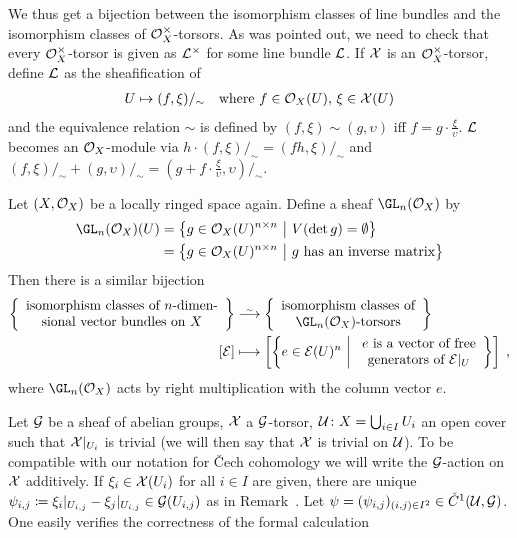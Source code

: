 \documentclass[a4paper,parskip=half,numbers=enddot, DIV=12]{scrreprt}
\newcommand{\vC}{\v{C}}
\begin{document}
\begin{example}
\begin{alphanumerate}
		We thus get a bijection between the isomorphism classes of line bundles and the isomorphism classes of $\mathcal{O}_X^\times$-torsors. As was pointed out, we need to check that every $\mathcal{O}_X^\times$-torsor is given as $\mathcal{L}^\times$ for some line bundle $\mathcal{L}$. If $\mathcal{X}$ is an $\mathcal{O}_X^\times$-torsor, define $\mathcal{L}$ as the sheafification of 
		\begin{align*}
			U\mapsto (f,\xi)/_\sim\quad\text{where }f\in\mathcal{O}_X(U)\text{, }\xi\in\mathcal{X}(U)
		\end{align*}
		and the equivalence relation $\sim$ is defined by $(f,\xi)\sim (g,\upsilon)$ iff $f=g\cdot\frac{\xi}{\upsilon}$. $\mathcal{L}$ becomes an $\mathcal{O}_X$-module via $h\cdot (f,\xi)/_\sim=(fh,\xi)/_\sim$ and $(f,\xi)/_\sim+(g,\upsilon)/_\sim=\left(g+f\cdot \frac{\xi}{\upsilon},\upsilon\right)/_\sim$.
		\item Let $(X,\mathcal{O}_X)$ be a locally ringed space again. Define a sheaf $\GL_n(\Oo_X)$ by
		\begin{align*}
			\GL_n(\Oo_X)(U)&=\left\{g\in\Oo_X(U)^{n\times n}\st V(\det g)=\emptyset\right\}\\
			&=\left\{g\in\Oo_X(U)^{n\times n}\st g\text{ has an inverse matrix}\right\}
		\end{align*}
		Then there is a similar bijection
		\begin{align*}
			\left\{\begin{array}{c}
				\text{isomorphism classes of }n\text{-dimen-}\\
				\text{sional vector bundles on }X
			\end{array}
			\right\} & \isomorphism\left\{\begin{array}{c}
			\text{isomorphism classes of}\\
			\GL_n(\Oo_X)\text{-torsors}
			\end{array}
			\right\}\\
			[\Ee]&\longmapsto \left[\left\{e\in\Ee(U)^n\st 
			\begin{array}{c}
			e\text{ is a vector of free}\\
			\text{generators of }\Ee|_U
			\end{array}
			\right\}\right]\;,
		\end{align*}
		where $\GL_n(\Oo_X)$ acts by right multiplication with the column vector $e$.
	\end{alphanumerate}
\end{example}
Let $\mathcal{G}$ be a sheaf of abelian groups, $\mathcal{X}$ a $\mathcal{G}$-torsor, $\mathcal{U}\colon X=\bigcup_{i\in I}U_i$ an open cover such that $\mathcal{X}|_{U_i}$ is trivial (we will then say that $\mathcal{X}$ is trivial on $\mathcal{U}$). To be compatible with our notation for \vC ech cohomology we will write the $\mathcal{G}$-action on $\mathcal{X}$ additively. If $\xi_i\in\mathcal{X}(U_i)$ for all $i\in I$ are given, there are unique $\psi_{i,j}\coloneqq \xi_i|_{U_{i,j}}-\xi_j|_{U_{i,j}}\in\mathcal{G}(U_{i,j})$ as in Remark~. Let $\psi=(\psi_{i,j})_{(i,j)\in I^2}\in\check{C}^1(\mathcal{U},\mathcal{G})$. One easily verifies the correctness of the formal calculation
\end{document}
